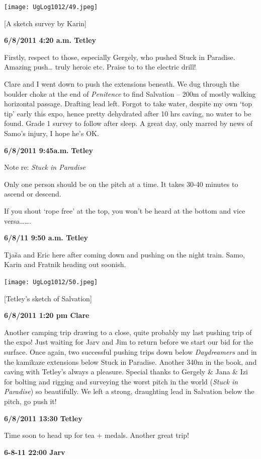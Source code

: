 \texttt{[image: UgLog1012/49.jpeg]}

{[}A sketch survey by Karin{]}

\textbf{6/8/2011 4:20 a.m. Tetley}

Firstly, respect to those, especially Gergely, who pushed Stuck in
Paradise. Amazing push\ldots{} truly heroic etc. Praise to to the
electric drill!

Clare and I went down to push the extensions beneath. We dug through the
boulder choke at the end of \emph{Penitence} to find Salvation -- 200m
of mostly walking horizontal passage. Drafting lead left. Forgot to take
water, despite my own `top tip' early this expo, hence pretty dehydrated
after 10 hrs caving, no water to be found. Grade 1 survey to follow
after sleep. A great day, only marred by news of Samo's injury, I hope
he's OK.

\textbf{6/8/2011 9:45a.m.} \textbf{Tetley}

Note re: \emph{Stuck in Paradise}

Only one person should be on the pitch at a time. It takes 30-40 minutes
to ascend or descend.

If you shout `rope free' at the top, you won't be heard at the bottom
and vice versa\ldots{}\ldots{}.

\textbf{6/8/11 9:50 a.m. Tetley}

Tjaša and Eric here after coming down and pushing on the night train.
Samo, Karin and Fratnik heading out soonish.

\texttt{[image: UgLog1012/50.jpeg]}

{[}Tetley's sketch of Salvation{]}

\textbf{6/8/2011 1:20 pm Clare}

Another camping trip drawing to a close, quite probably my last pushing
trip of the expo! Just waiting for Jarv and Jim to return before we
start our bid for the surface. Once again, two successful pushing trips
down below \emph{Daydreamers} and in the kamikaze extensions below Stuck
in Paradise. Another 340m in the book, and caving with Tetley's always a
pleasure. Special thanks to Gergely \& Jana \& Izi for bolting and
rigging and surveying the worst pitch in the world (\emph{Stuck in
Paradise}) so beautifully. We left a strong, draughting lead in
Salvation below the pitch, go push it!

\textbf{6/8/2011 13:30 Tetley}

Time soon to head up for tea + medals. Another great trip!

\textbf{6-8-11 22:00 Jarv}

